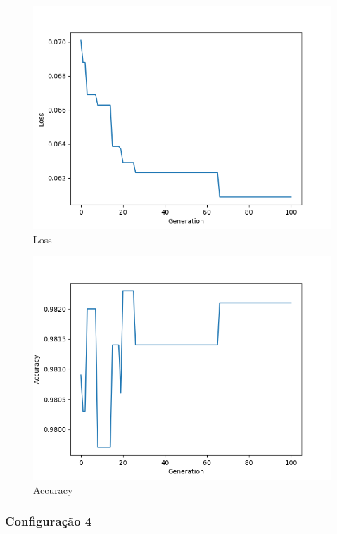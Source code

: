 \documentclass[twoside,conference,a4paper]{IEEEtran}
\begin{document}
\begin{figure}[htbp]
        \centering \includegraphics[width=1\columnwidth]{./ia_proj_images/mnist/3/loss.png}
        \caption{
                \label{fig:loss_mnist_03}
                Loss
        }
\end{figure}
\begin{figure}[htbp]
        \centering \includegraphics[width=1\columnwidth]{./ia_proj_images/mnist/3/acc.png}
        \caption{
                \label{fig:acc_mnist_03}
                Accuracy
        }
\end{figure}

\subsubsection{Configuração 4}
\end{document}
